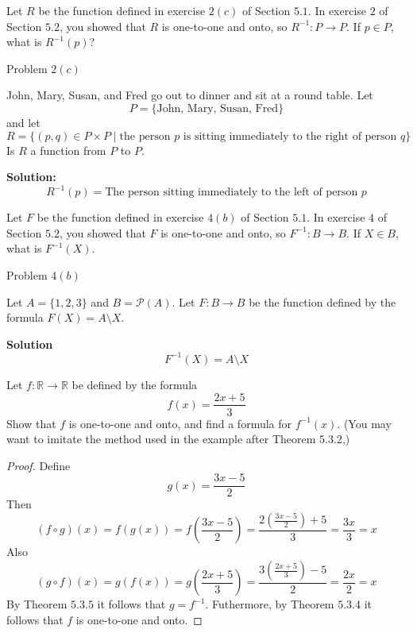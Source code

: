 \begin{tcolorbox}[title=Problem 1, breakable]
    Let $R$ be the function defined in exercise $2(c)$ of Section $5.1$.
    In exercise $2$ of Section $5.2$, you showed that $R$ is one-to-one
    and onto, so $R^{-1} : P \rightarrow P$. If $p \in P$,
        what is $R^{-1}(p)$?

    Problem $2(c)$

    John, Mary, Susan, and Fred go out to dinner and sit at a round table.
    Let 
    \[P = \{\text{John, Mary, Susan, Fred}\}\]
    and let 
    \[R = \{(p, q) \in P \times P \mid \text{the person $p$ is sitting immediately to the right of person $q$}\}\]
    Is $R$ a function from $P$ to $P$.
\end{tcolorbox}

\textbf{Solution:}
\[R^{-1}(p) = \text{The person sitting immediately to the left of person $p$}\]

\begin{tcolorbox}[title=Problem 2, breakable]
    Let $F$ be the function defined in exercise $4(b)$ of Section $5.1$.
    In exercise $4$ of Section $5.2$, you showed that $F$ is one-to-one 
    and onto, so $F^{-1} : B \rightarrow B$. If $X \in B$,
    what is $F^{-1}(X)$.

    Problem $4(b)$

    Let $A = \{1, 2, 3\}$ and $B = \mathcal{P}(A)$.
    Let $F : B \rightarrow B$ be the function defined by the 
        formula $F(X) = A \setminus X$.
\end{tcolorbox}

\textbf{Solution}
\[F^{-1}(X) = A \setminus X\]

\begin{tcolorbox}[title=Problem 3, breakable]
    Let $f : \mathbb{R} \rightarrow \mathbb{R}$ be defined by the formula 
    \[f(x) = \frac{2x + 5}{3}\]
    Show that $f$ is one-to-one and onto, and find a formula for $f^{-1}(x)$.
    (You may want to imitate the method used in the example after Theorem $5.3.2$,)
\end{tcolorbox}

\begin{proof}
    Define
    \[g(x) = \frac{3x - 5}{2}\]
    Then 
    \[(f \circ g)(x) = f(g(x)) = f(\frac{3x - 5}{2}) = \frac{2\left(\frac{3x - 5}{2}\right) + 5}{3} = \frac{3x}{3} = x\]
    Also 
    \[(g \circ f)(x) = g(f(x)) = g(\frac{2x + 5}{3}) = \frac{3\left(\frac{2x + 5}{3}\right) - 5}{2} = \frac{2x}{2} = x\]
    By Theorem $5.3.5$ it follows that $g = f^{-1}$.
    Futhermore, by Theorem $5.3.4$ it follows that $f$ is one-to-one and onto.
\end{proof}


